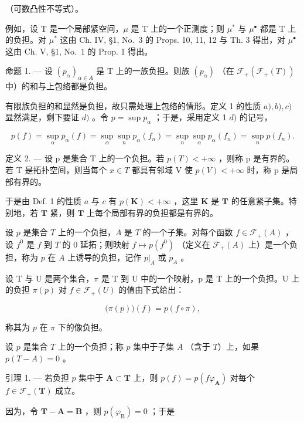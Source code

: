 （可数凸性不等式）。

例如，设 T 是一个局部紧空间，\(\mu\) 是 T 上的一个正测度；则 \(\mu^{*}\) 与 \(\mu^{\bullet}\) 都是 T 上的负担。对 \(\mu^{*}\) 这由 Ch. IV, §1, No.~3 的 Props. 10, 11, 12 与 Th. 3 得出，对 \(\mu^{\bullet}\) 这由 Ch. V, §1, No.~1 的 Prop. 1 得出。

命题 1. --- 设 \((p_{\alpha})_{\alpha \in A}\) 是 T 上的一族负担。则族 \((p_{\alpha})\) （在 \(\mathcal{F}_{+}(\mathcal{F}_{+}(T))\) 中）的和与上包络都是负担。

有限族负担的和显然是负担，故只需处理上包络的情形。定义 1 的性质 \(a), b), c)\) 显然满足，剩下要证 \(d)\) 。令 \(p = \sup p_{\alpha}\) ；于是，采用定义 1 \(d)\) 的记号，

\[
p (f) = \sup _ {\alpha} p _ {\alpha} (f) = \sup _ {\alpha} \sup _ {n} p _ {\alpha} (f _ {n}) = \sup _ {n} \sup _ {\alpha} p _ {\alpha} (f _ {n}) = \sup _ {n} p (f _ {n}).
\]

定义 2. --- 设 p 是集合 T 上的一个负担。若 \(p(T) < +\infty\) ，则称 p 是有界的。若 T 是拓扑空间，则当每个 \(x \in T\) 都具有邻域 V 使 \(p(V) < +\infty\) 时，称 p 是局部有界的。

于是由 Def. 1 的性质 \(a\) 与 \(c\) 有 \(p(\mathbf{K}) < +\infty\) ，这里 \(\mathbf{K}\) 是 \(\mathbf{T}\) 的任意紧子集。特别地，若 \(\mathbf{T}\) 紧，则 \(\mathbf{T}\) 上每个局部有界的负担都是有界的。

设 \(p\) 是集合 \(T\) 上的一个负担，\(A\) 是 \(T\) 的一个子集。对每个函数 \(f \in \mathcal{F}_{+}(A)\) ，设 \(f^0\) 是 \(f\) 到 \(T\) 的 0 延拓；则映射 \(f \mapsto p(f^0)\) （定义在 \(\mathcal{F}_{+}(A)\) 上）是一个负担，称为 \(p\) 在 \(A\) 上诱导的负担，记作 \(p|_{A}\) 或 \(p_A\) 。

设 T 与 U 是两个集合，\(\pi\) 是 T 到 U 中的一个映射，p 是 T 上的一个负担。U 上的负担 \(\pi(p)\) 对 \(f \in \mathcal{F}_{+}(U)\) 的值由下式给出：

\[
\bigl (\pi (p) \bigr) (f) = p (f \circ \pi),
\]

称其为 \(p\) 在 \(\pi\) 下的像负担。

设 \(p\) 是集合 \(T\) 上的一个负担；称 \(p\) 集中于子集 \(A\) （含于 \(T\)）上，如果 \(p(T - A) = 0\) 。

引理 1. --- 若负担 \(p\) 集中于 \(\mathbf{A} \subset \mathbf{T}\) 上，则 \(p(f) = p(f\varphi_{\mathbf{A}})\) 对每个 \(f \in \mathcal{F}_{+}(\mathbf{T})\) 成立。

因为，令 \(\mathbf{T} - \mathbf{A} = \mathbf{B}\) ，则 \(p(\varphi_{\mathrm{B}}) = 0\) ；于是

